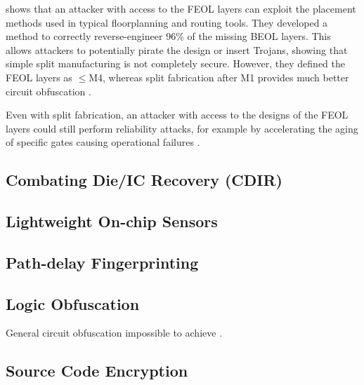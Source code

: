 \documentclass{IEEEtran}
\begin{document}
\cite{Split} shows that an attacker with access to the FEOL layers can exploit the placement methods used in typical floorplanning and routing tools. They developed a method to correctly reverse-engineer 96\% of the missing BEOL layers. This allows attackers to potentially pirate the design or insert Trojans, showing that simple split manufacturing is not completely secure. However, they defined the FEOL layers as $\le$M4, whereas split fabrication after M1 provides much better circuit obfuscation \cite{vaidyanathan2014detecting}. 

Even with split fabrication, an attacker with access to the designs of the FEOL layers could still perform reliability attacks, for example by accelerating the aging of specific gates causing operational failures \cite{vaidyanathan2014detecting}. 


\subsection{Combating Die/IC Recovery (CDIR)}

\subsection{Lightweight On-chip Sensors}


\subsection{Path-delay Fingerprinting}

\subsection{Logic Obfuscation}

General circuit obfuscation impossible to achieve \cite{TrojanDetectionUsingICFingerprints}.

\subsection{Source Code Encryption}










\end{document}

